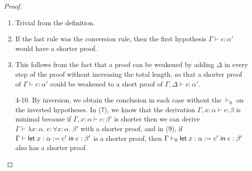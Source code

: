 \begin{proof}\ \\[-1em]
\begin{enumerate}
\item Trivial from the definition.
\item If the last rule was the conversion rule, then the first hypothesis $\Gamma\vdash e:\alpha'$ would have a shorter proof.
\item This follows from the fact that a proof can be weakened by adding $\Delta$ in every step of the proof without increasing the total length, so that a shorter proof of $\Gamma\vdash e:\alpha'$ could be weakened to a short proof of $\Gamma,\Delta\vdash e:\alpha'$.
\item[4-10.] By inversion, we obtain the conclusion in each case without the $\vdash_0$ on the inverted hypotheses. In (7), we know that the derivation $\Gamma,x:\alpha\vdash e:\beta$ is minimal because if $\Gamma,x:\alpha\vdash e:\beta'$ is shorter then we can derive $\Gamma\vdash \lambda x:\alpha.\;e:\forall x:\alpha.\;\beta'$ with a shorter proof, and in (9), if $\Gamma\vdash \elet{x:\alpha:=e'}{e}:\beta'$ is a shorter proof, then $\Gamma\vdash_0 \elet{x:\alpha:=e'}{e}:\beta'$ also has a shorter proof.
\end{enumerate}
\end{proof}

